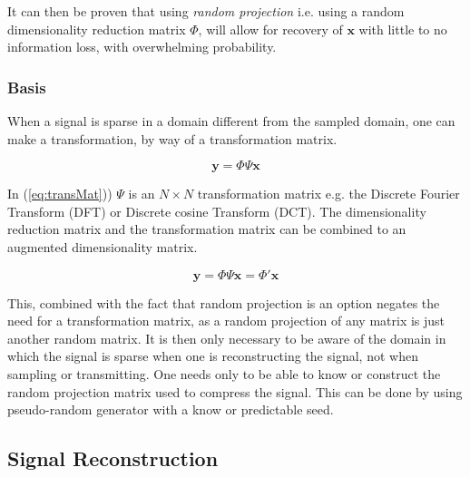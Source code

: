 \documentclass[Main]{subfiles}
\begin{document}
			It can then be proven that using \emph{random projection} i.e. using a random dimensionality reduction matrix $\Phi$, will allow for recovery of $\mathbf{x}$ with little to no information loss, with overwhelming probability.
		

		\subsubsection{Basis} %
		\label{sub:basis}
			
			When a signal is sparse in a domain different from the sampled domain, one can make a transformation, by way of a transformation matrix.

			\begin{equation}
				\mathbf{y} = \Phi \Psi \mathbf{x}
				\label{eq:transMat}	
			\end{equation}

			In (\ref{eq:transMat})) $\Psi$ is an $N \times N$ transformation matrix e.g. the Discrete Fourier Transform (DFT) or Discrete cosine Transform (DCT).
			The dimensionality reduction matrix and the transformation matrix can be combined to an augmented dimensionality matrix.

			\begin{equation}
				\mathbf{y} = \Phi \Psi \mathbf{x} = \Phi' \mathbf{x}
				\label{eq:augDimReduc}	
			\end{equation}

			This, combined with the fact that random projection is an option negates the need for a transformation matrix, as a random projection of any matrix is just another random matrix.
			It is then only necessary to be aware of the domain in which the signal is sparse when one is reconstructing the signal, not when sampling or transmitting.
			One needs only to be able to know or construct the random projection matrix used to compress the signal.
			This can be done by using pseudo-random generator with a know or predictable seed.


		\subsection{Signal Reconstruction} %
		\label{sub:signal_reconstruction}

		
\end{document}
